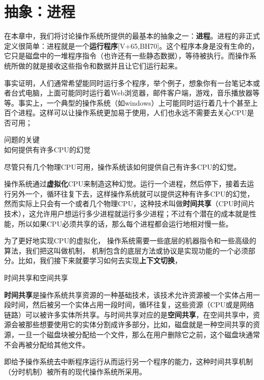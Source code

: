 \chapter{抽象：进程}
\thispagestyle{empty}

在本章中，我们将讨论操作系统所提供的最基本的抽象之一：\textbf{进程}。进程的非正式定义很简单：进程就是一个\textbf{运行程序}[V+65,BH70]。这个程序本身是没有生命的，它只是磁盘中的一堆程序指令（也许还有一些静态数据），等待被执行。而操作系统所做的就是接收这些指令和数据并且让它们运行起来。

事实证明，人们通常希望能同时运行多个程序，举个例子，想象你有一台笔记本或者台式电脑，上面可能同时运行着Web浏览器，邮件客户端，游戏，音乐播放器等等。事实上，一个典型的操作系统（如windows）上可能同时运行着几十个甚至上百个进程。这样可以让操作系统更加易于使用，人们也永远不需要去关心CPU是否可用；
\begin{tcolorbox}[colframe=grey,colback= grey,arc=0pt,left=6pt,right=6pt,top=6pt,bottom=6pt,boxsep=0pt]
\begin{center}
问题的关键\\
如何提供有许多CPU的幻觉
\end{center}
尽管只有几个物理CPU可用，操作系统该如何提供自己有许多CPU的幻觉。
\end{tcolorbox}
操作系统通过\textbf{虚拟化}CPU来制造这种幻觉。运行一个进程，然后停下，接着去运行另外一个，循环往复下去，这样操作系统就可以提供这种有许多CPU的幻觉， 然而实际上只会有一个或者几个物理CPU，这种技术叫做\textbf{时间共享}（CPU时间片技术），这允许用户想运行多少进程就运行多少进程；不过有个潜在的成本就是性能，所以如果CPU必须共享的话，那么每个进程都会运行地相对慢一些。

为了更好地实现CPU的虚拟化， 操作系统需要一些底层的机器指令和一些高级的算法，我们把这叫做机制， 机制包含的底层方法或协议是实现功能的一个必须部分。比如，我们接下来就要学习如何去实现\textbf{上下文切换}，
\begin{tcolorbox}[colframe=grey,colback= grey,arc=0pt,left=6pt,right=6pt,top=6pt,bottom=6pt,boxsep=0pt]
  \begin{center}
  时间共享和空间共享\\
  \end{center}
  \textbf{时间共享}是操作系统共享资源的一种基础技术，该技术允许资源被一个实体占用一段时间，然后被另一个实体占用一段时间，循环往复，这些资源（CPU或是网络链路）可以被许多实体所共享。与时间共享对应的是\textbf{空间共享}，在空间共享中，资源会被那些想要使用它的实体分割成许多部分，比如，磁盘就是一种空间共享的资源，一旦一个磁盘块被分配给一个文件，那么在用户删除它之前，这个磁盘块通常不会再被分配给其他文件。
  \end{tcolorbox}
即给予操作系统去中断程序运行从而运行另一个程序的能力，这种时间共享机制（分时机制）被所有的现代操作系统所采用。

